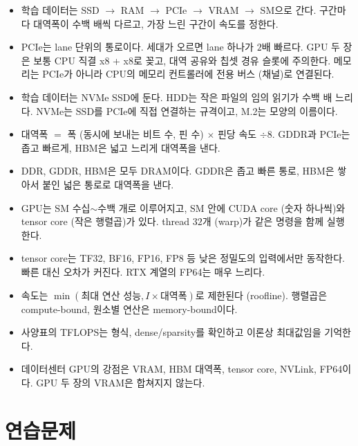 \documentclass[11pt,a4paper]{article}
\begin{document}
\begin{keybox}
\begin{itemize}[leftmargin=1.5em]
\item 학습 데이터는 SSD $\to$ RAM $\to$ PCIe $\to$ VRAM $\to$ SM으로 간다. 구간마다 대역폭이 수백 배씩 다르고, 가장 느린 구간이 속도를 정한다.
\item PCIe는 lane 단위의 통로이다. 세대가 오르면 lane 하나가 $2$배 빠르다. GPU 두 장은 보통 CPU 직결 x8 + x8로 꽂고, 대역 공유와 칩셋 경유 슬롯에 주의한다.
메모리는 PCIe가 아니라 CPU의 메모리 컨트롤러에 전용 버스 (채널)로 연결된다.
\item 학습 데이터는 NVMe SSD에 둔다. HDD는 작은 파일의 임의 읽기가 수백 배 느리다. NVMe는 SSD를 PCIe에 직접 연결하는 규격이고, M.2는 모양의 이름이다.
\item 대역폭 $=$ 폭 (동시에 보내는 비트 수, 핀 수) $\times$ 핀당 속도 $\div8$. GDDR과 PCIe는 좁고 빠르게, HBM은 넓고 느리게 대역폭을 낸다.
\item DDR, GDDR, HBM은 모두 DRAM이다. GDDR은 좁고 빠른 통로, HBM은 쌓아서 붙인 넓은 통로로 대역폭을 낸다.
\item GPU는 SM 수십$\sim$수백 개로 이루어지고, SM 안에 CUDA core (숫자 하나씩)와 tensor core (작은 행렬곱)가 있다. thread $32$개 (warp)가 같은 명령을 함께 실행한다.
\item tensor core는 TF32, BF16, FP16, FP8 등 낮은 정밀도의 입력에서만 동작한다. 빠른 대신 오차가 커진다. RTX 계열의 FP64는 매우 느리다.
\item 속도는 $\min(\text{최대 연산 성능}, I\times\text{대역폭})$로 제한된다 (roofline). 행렬곱은 compute-bound, 원소별 연산은 memory-bound이다.
\item 사양표의 TFLOPS는 형식, dense/sparsity를 확인하고 이론상 최대값임을 기억한다.
\item 데이터센터 GPU의 강점은 VRAM, HBM 대역폭, tensor core, NVLink, FP64이다. GPU 두 장의 VRAM은 합쳐지지 않는다.
\end{itemize}
\end{keybox}

\section{연습문제}
\end{document}
